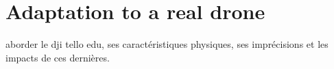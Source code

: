 \chapter{Adaptation to a real drone}

aborder le dji tello edu, ses caractéristiques physiques, ses imprécisions et les impacts de ces dernières.
